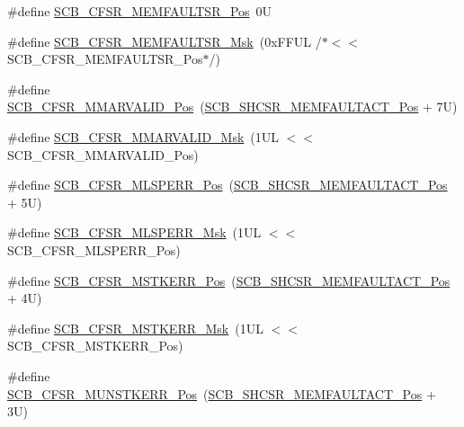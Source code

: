 \begin{DoxyCompactItemize}
\item 
\#define \mbox{\hyperlink{group___c_m_s_i_s___s_c_b_ga91f41491cec5b5acca3fbc94efbd799e}{S\+C\+B\+\_\+\+C\+F\+S\+R\+\_\+\+M\+E\+M\+F\+A\+U\+L\+T\+S\+R\+\_\+\+Pos}}~0U
\item 
\#define \mbox{\hyperlink{group___c_m_s_i_s___s_c_b_gad46716159a3808c9e7da22067d6bec98}{S\+C\+B\+\_\+\+C\+F\+S\+R\+\_\+\+M\+E\+M\+F\+A\+U\+L\+T\+S\+R\+\_\+\+Msk}}~(0x\+F\+F\+U\+L /$\ast$$<$$<$ S\+C\+B\+\_\+\+C\+F\+S\+R\+\_\+\+M\+E\+M\+F\+A\+U\+L\+T\+S\+R\+\_\+\+Pos$\ast$/)
\item 
\#define \mbox{\hyperlink{group___c_m_s_i_s___s_c_b_gaf9a595a3a8e0171473d486b490669165}{S\+C\+B\+\_\+\+C\+F\+S\+R\+\_\+\+M\+M\+A\+R\+V\+A\+L\+I\+D\+\_\+\+Pos}}~(\mbox{\hyperlink{group___c_m_s_i_s___s_c_b_ga7c856f79a75dcc1d1517b19a67691803}{S\+C\+B\+\_\+\+S\+H\+C\+S\+R\+\_\+\+M\+E\+M\+F\+A\+U\+L\+T\+A\+C\+T\+\_\+\+Pos}} + 7\+U)
\item 
\#define \mbox{\hyperlink{group___c_m_s_i_s___s_c_b_ga33f17b24b05b0405de908ce185bef5c3}{S\+C\+B\+\_\+\+C\+F\+S\+R\+\_\+\+M\+M\+A\+R\+V\+A\+L\+I\+D\+\_\+\+Msk}}~(1\+U\+L $<$$<$ S\+C\+B\+\_\+\+C\+F\+S\+R\+\_\+\+M\+M\+A\+R\+V\+A\+L\+I\+D\+\_\+\+Pos)
\item 
\#define \mbox{\hyperlink{group___c_m_s_i_s___s_c_b_ga1390a486a538d1bb8e9661b678e88e39}{S\+C\+B\+\_\+\+C\+F\+S\+R\+\_\+\+M\+L\+S\+P\+E\+R\+R\+\_\+\+Pos}}~(\mbox{\hyperlink{group___c_m_s_i_s___s_c_b_ga7c856f79a75dcc1d1517b19a67691803}{S\+C\+B\+\_\+\+S\+H\+C\+S\+R\+\_\+\+M\+E\+M\+F\+A\+U\+L\+T\+A\+C\+T\+\_\+\+Pos}} + 5\+U)
\item 
\#define \mbox{\hyperlink{group___c_m_s_i_s___s_c_b_gac0602ef4ef443ef6ccb1f24d6886661a}{S\+C\+B\+\_\+\+C\+F\+S\+R\+\_\+\+M\+L\+S\+P\+E\+R\+R\+\_\+\+Msk}}~(1\+U\+L $<$$<$ S\+C\+B\+\_\+\+C\+F\+S\+R\+\_\+\+M\+L\+S\+P\+E\+R\+R\+\_\+\+Pos)
\item 
\#define \mbox{\hyperlink{group___c_m_s_i_s___s_c_b_ga76517c60f54396e7cf075876e8af7a62}{S\+C\+B\+\_\+\+C\+F\+S\+R\+\_\+\+M\+S\+T\+K\+E\+R\+R\+\_\+\+Pos}}~(\mbox{\hyperlink{group___c_m_s_i_s___s_c_b_ga7c856f79a75dcc1d1517b19a67691803}{S\+C\+B\+\_\+\+S\+H\+C\+S\+R\+\_\+\+M\+E\+M\+F\+A\+U\+L\+T\+A\+C\+T\+\_\+\+Pos}} + 4\+U)
\item 
\#define \mbox{\hyperlink{group___c_m_s_i_s___s_c_b_ga30331822fa13db8ee288173cfbcbbf72}{S\+C\+B\+\_\+\+C\+F\+S\+R\+\_\+\+M\+S\+T\+K\+E\+R\+R\+\_\+\+Msk}}~(1\+U\+L $<$$<$ S\+C\+B\+\_\+\+C\+F\+S\+R\+\_\+\+M\+S\+T\+K\+E\+R\+R\+\_\+\+Pos)
\item 
\#define \mbox{\hyperlink{group___c_m_s_i_s___s_c_b_ga9e5bd9bcd654e271a3e78c5c0a39444d}{S\+C\+B\+\_\+\+C\+F\+S\+R\+\_\+\+M\+U\+N\+S\+T\+K\+E\+R\+R\+\_\+\+Pos}}~(\mbox{\hyperlink{group___c_m_s_i_s___s_c_b_ga7c856f79a75dcc1d1517b19a67691803}{S\+C\+B\+\_\+\+S\+H\+C\+S\+R\+\_\+\+M\+E\+M\+F\+A\+U\+L\+T\+A\+C\+T\+\_\+\+Pos}} + 3\+U)
$$
\end{DoxyCompactItemize}
